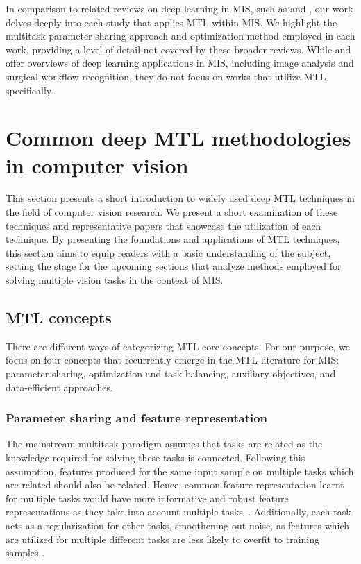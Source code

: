 \documentclass[times,twocolumn,final]{elsarticle}
\begin{document}
In comparison to related reviews on deep learning in MIS, such as \citet{rivas2021review} and \citet{demir2023deep}, our work delves deeply into each study that applies MTL within MIS. We highlight the multitask parameter sharing approach and optimization method employed in each work, providing a level of detail not covered by these broader reviews. While \citet{rivas2021review} and \citet{demir2023deep} offer overviews of deep learning applications in MIS, including image analysis and surgical workflow recognition, they do not focus on works that utilize MTL specifically.

\section{Common deep MTL methodologies in computer vision}\label{sec::multitask_learning_natural_images}


This section presents a short introduction to widely used deep MTL techniques in the field of computer vision research. We present a short examination of these techniques and representative papers that showcase the utilization of each technique. By presenting the foundations and applications of MTL techniques, this section aims to equip readers with a basic understanding of the subject, setting the stage for the upcoming sections that analyze methods employed for solving multiple vision tasks in the context of MIS.


\subsection{MTL concepts}
There are different ways of categorizing MTL core concepts. For our purpose, we focus on four concepts that recurrently emerge in the MTL literature for MIS: parameter sharing, optimization and task-balancing, auxiliary objectives, and data-efficient approaches.  


\subsubsection{Parameter sharing and feature representation} \label{subsec::parameter_sharing}
The mainstream multitask paradigm assumes that tasks are related as the knowledge required for solving these tasks is connected. Following this assumption, features produced for the same input sample on multiple tasks which are related should also be related. 
Hence, common feature representation learnt for multiple tasks would have more informative and robust feature representations as they take into account multiple tasks~\citep{survey_zhang}.
Additionally, each task acts as a regularization for other tasks, smoothening out noise, as features which are utilized for multiple different tasks are less likely to overfit to training samples \citep{survey_zhang}. 
\end{document}
